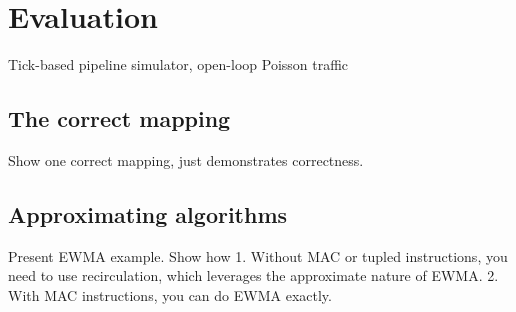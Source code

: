 \section{Evaluation}
\label{s:evaluation}
Tick-based pipeline simulator, open-loop Poisson traffic

\subsection{The correct mapping}
Show one correct mapping, just demonstrates correctness.

\subsection{Approximating algorithms}
Present EWMA example. Show how
1. Without MAC or tupled instructions, you need to use recirculation, which leverages the approximate nature of EWMA.
2. With MAC instructions, you can do EWMA exactly.
